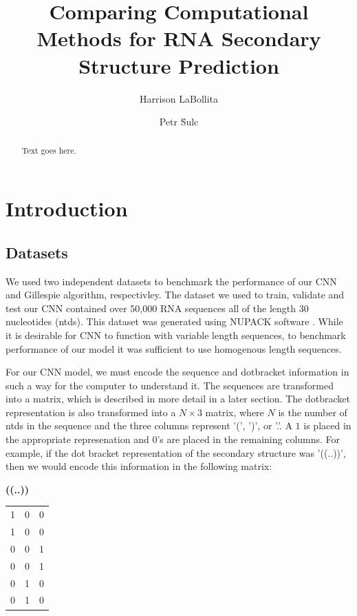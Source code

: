 \documentclass[11pt]{article}
\title{{\bf Comparing Computational Methods for RNA Secondary Structure Prediction}}
\author[1]{Harrison LaBollita}
\author[2]{Petr \u Sulc}
\date{}
\affil[1]{Department of Physics, Arizona State University, Tempe, AZ 85281 USA}
\affil[2]{Center for Biological Physics, Arizona State University, Tempe, AZ 85281 USA}
\begin{document}
\maketitle
\begin{abstract}
Text goes here.
\end{abstract}
\tableofcontents
\section{Introduction}


\begin{multicols}{2}
\section{Datasets}
We used two independent datasets to benchmark the performance of our CNN and Gillespie algorithm, respectivley. The dataset we used to train, validate and test our CNN contained over 50,000 RNA sequences all of the length 30 nucleotides (ntds). This dataset was generated using NUPACK software \cite{doi:10.1002/jcc.21596}. While it is desirable for CNN to function with variable length sequences, to benchmark performance of our model it was sufficient to use homogenous length sequences.


For our CNN model, we must encode the sequence and dotbracket information in such a way for the computer to understand it. The sequences are transformed into a matrix, which is described in more detail in a later section. The dotbracket representation is also transformed into a $N \times 3$ matrix, where $N$ is the number of ntds in the sequence and the three columns represent '(', ')', or '.'. A $1$ is placed in the appropriate represenation and $0$'s are placed in the remaining columns. For example, if the dot bracket representation of the secondary structure was '((..))', then we would encode this information in the following matrix:


\begin{center}
{\bf ((..))}\\

\begin{tabular}{|c|c|c|}
\hline
1 & 0 & 0\\
1 & 0 & 0\\
0 & 0 & 1\\
0 & 0 & 1\\
0 & 1 & 0\\
0 & 1 & 0\\
\end{tabular}
\end{center}


\end{multicols}
\end{document}
